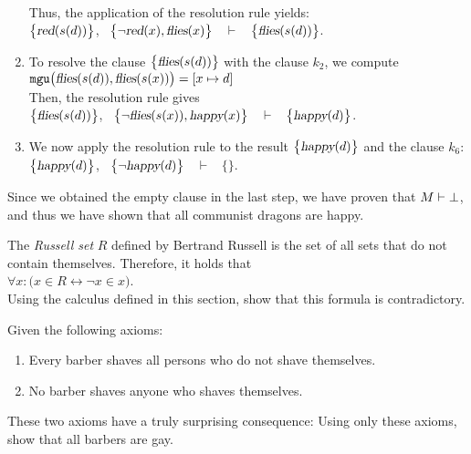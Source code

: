\begin{enumerate}
      \\[0.2cm]
      Thus, the application of the resolution rule yields:
      \\[0.2cm]
      \hspace*{1.3cm}
      $\bigl\{\textsl{red}(s(d))\bigl\}$, \ $\bigl\{\neg \textsl{red}(x), \textsl{flies}(x)\bigl\}$ \ $\vdash$ \ $\bigl\{\textsl{flies}(s(d))\bigl\}$.
\item To resolve the clause $\bigl\{\textsl{flies}(s(d))\bigl\}$ with the clause $k_2$, we compute
      \\[0.2cm]
      \hspace*{1.3cm}
      $\mathtt{mgu}\bigl(\textsl{flies}(s(d)), \textsl{flies}(s(x))\bigr) = [x \mapsto d]$
      \\[0.2cm]
      Then, the resolution rule gives
      \\[0.2cm]
      \hspace*{1.3cm}
      $\bigl\{\textsl{flies}(s(d))\bigl\}$, \ $\bigl\{\neg \textsl{flies}(s(x)), \textsl{happy}(x)\bigl\}$ \ $\vdash$ \ $\bigl\{\textsl{happy}(d)\bigl\}$.
\item We now apply the resolution rule to the result $\bigl\{\textsl{happy}(d)\bigl\}$ and the clause $k_6$:
      \\[0.2cm]
      \hspace*{1.3cm}
      $\bigl\{\textsl{happy}(d)\bigl\}$, \ $\bigl\{\neg \textsl{happy}(d)\bigl\}$ \ $\vdash$ \ $\bigl\{\bigl\}$.
\end{enumerate}
Since we obtained the empty clause in the last step, we have proven that $M \vdash \bot$, and thus we have
shown that all communist dragons are happy. 
\eox

\exerciseEng
The \emph{Russell set} $R$ defined by Bertrand Russell is the set of all sets that do not contain themselves. Therefore, it holds that
\\[0.2cm]
\hspace*{1.3cm}
$\forall x: \bigl( x \in R \leftrightarrow \neg x \in x \bigr)$.
\\[0.2cm]
Using the calculus defined in this section, show that this formula is contradictory. \eox
\vspace{0.3cm}

\exerciseEng
Given the following axioms:
\begin{enumerate}
\item Every barber shaves all persons who do not shave themselves.
\item No barber shaves anyone who shaves themselves.
\end{enumerate}
These two axioms have a truly surprising consequence: Using only these axioms,  show that all barbers are
gay. \eox 

